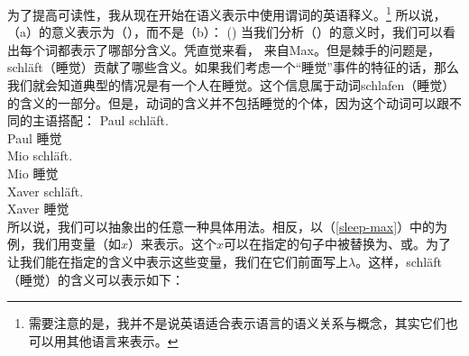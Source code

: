 \noindent
为了提高可读性，我从现在开始在语义表示中使用谓词的英语释义。\footnote{%
需要注意的是，我并不是说英语适合表示语言的语义关系与概念，其实它们也可以用其他语言来表示。
}
所以说，（a）的意义表示为（），而不是（b）：
\ea
\label{sleep-max}
()
\z
当我们分析（）的意义时，我们可以看出每个词都表示了哪部分含义。凭直觉来看， 来自Max。但是棘手的问题是，schläft（睡觉）贡献了哪些含义。如果我们考虑一个“睡觉”事件的特征的话，那么我们就会知道典型的情况是有一个人在睡觉。这个信息属于动词schlafen（睡觉）的含义的一部分。但是，动词的含义并不包括睡觉的个体，因为这个动词可以跟不同的主语搭配：
\addlines
\eal
\ex 
\gll Paul schläft.\\
     Paul 睡觉\\
\ex 
\gll Mio schläft.\\
     Mio 睡觉\\
\ex 
\gll Xaver schläft.\\
     Xaver 睡觉\\
\zl
所以说，我们可以抽象出的任意一种具体用法。相反，以（\ref{sleep-max}）中的为例，我们用变量（如$x$）来表示。这个$x$可以在指定的句子中被替换为、或。为了让我们能在指定的含义中表示这些变量，我们在它们前面写上$\lambda$。这样，schläft（睡觉）的含义可以表示如下：

